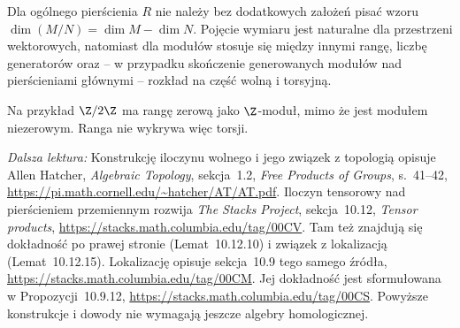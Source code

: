 \begin{uwaga}
Dla ogólnego pierścienia $R$ nie należy bez dodatkowych założeń
pisać wzoru $\dim(M/N)=\dim M-\dim N$.
Pojęcie wymiaru jest naturalne dla przestrzeni wektorowych, natomiast
dla modułów stosuje się między innymi rangę, liczbę generatorów
oraz -- w przypadku skończenie generowanych modułów nad
pierścieniami głównymi -- rozkład
na część wolną i torsyjną.

Na przykład $\Z/2\Z$ ma rangę zerową jako $\Z$-moduł,
mimo że jest modułem niezerowym. Ranga nie wykrywa więc torsji.
\end{uwaga}

\par\smallskip
{\footnotesize\noindent\emph{Dalsza lektura:}
Konstrukcję iloczynu wolnego i jego związek z topologią opisuje
Allen Hatcher, \emph{Algebraic Topology}, sekcja~1.2,
\emph{Free Products of Groups}, s.~41--42,
\url{https://pi.math.cornell.edu/~hatcher/AT/AT.pdf}.
Iloczyn tensorowy nad pierścieniem przemiennym rozwija
\emph{The Stacks Project}, sekcja~10.12, \emph{Tensor products},
\url{https://stacks.math.columbia.edu/tag/00CV}.
Tam też znajdują się dokładność po prawej stronie
(Lemat~10.12.10) i związek z lokalizacją (Lemat~10.12.15).
Lokalizację opisuje sekcja~10.9 tego samego źródła,
\url{https://stacks.math.columbia.edu/tag/00CM}.
Jej dokładność jest sformułowana w Propozycji~10.9.12,
\url{https://stacks.math.columbia.edu/tag/00CS}.
Powyższe konstrukcje i dowody nie wymagają jeszcze algebry homologicznej.\par}
